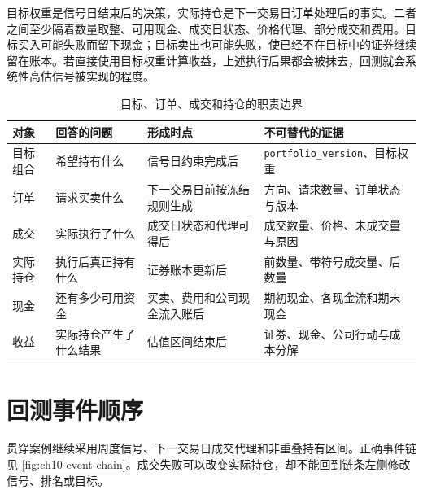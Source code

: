 目标权重是信号日结束后的决策，实际持仓是下一交易日订单处理后的事实。二者之间至少隔着数量取整、可用现金、成交日状态、价格代理、部分成交和费用。目标买入可能失败而留下现金；目标卖出也可能失败，使已经不在目标中的证券继续留在账本。若直接使用目标权重计算收益，上述执行后果都会被抹去，回测就会系统性高估信号被实现的程度。

\begin{table}[htbp]
  \centering
  \small
  \caption{目标、订单、成交和持仓的职责边界}
  \label{tab:ch10-object-responsibilities}
  \begin{tabularx}{\textwidth}{p{2.4cm} p{4.2cm} p{3.2cm} Y}
    \toprule
    对象 & 回答的问题 & 形成时点 & 不可替代的证据 \\
    \midrule
    目标组合 & 希望持有什么 & 信号日约束完成后 & \texttt{portfolio\_version}、目标权重 \\
    订单 & 请求买卖什么 & 下一交易日前按冻结规则生成 & 方向、请求数量、订单状态与版本 \\
    成交 & 实际执行了什么 & 成交日状态和代理可得后 & 成交数量、价格、未成交量与原因 \\
    实际持仓 & 执行后真正持有什么 & 证券账本更新后 & 前数量、带符号成交量、后数量 \\
    现金 & 还有多少可用资金 & 买卖、费用和公司现金流入账后 & 期初现金、各现金流和期末现金 \\
    收益 & 实际持仓产生了什么结果 & 估值区间结束后 & 证券、现金、公司行动与成本分解 \\
    \bottomrule
  \end{tabularx}
\end{table}

\section{回测事件顺序}

贯穿案例继续采用周度信号、下一交易日成交代理和非重叠持有区间。正确事件链见 \cref{fig:ch10-event-chain}。成交失败可以改变实际持仓，却不能回到链条左侧修改信号、排名或目标。

